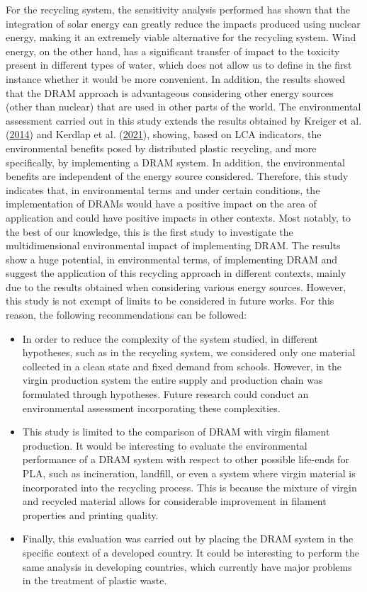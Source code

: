 \documentclass[12pt]{elsarticle} %
\begin{document}
For the recycling system, the sensitivity analysis performed has shown that the integration of solar energy can greatly reduce the impacts produced using nuclear energy, making it an extremely viable alternative for the recycling system.
Wind energy, on the other hand, has a significant transfer of impact to the toxicity present in different types of water, which does not allow us to define in the first instance whether it would be more convenient.
In addition, the results showed that the DRAM approach is advantageous considering other energy sources (other than nuclear) that are used in other parts of the world.
The environmental assessment carried out in this study extends the results obtained by Kreiger et al. (\protect\hyperlink{ref-Kreiger2014}{2014}) and Kerdlap et al. (\protect\hyperlink{ref-Kerdlap2021}{2021}), showing, based on LCA indicators, the environmental benefits posed by distributed plastic recycling, and more specifically, by implementing a DRAM system.
In addition, the environmental benefits are independent of the energy source considered.
Therefore, this study indicates that, in environmental terms and under certain conditions, the implementation of DRAMs would have a positive impact on the area of application and could have positive impacts in other contexts.
Most notably, to the best of our knowledge, this is the first study to investigate the multidimensional environmental impact of implementing DRAM.
The results show a huge potential, in environmental terms, of implementing DRAM and suggest the application of this recycling approach in different contexts, mainly due to the results obtained when considering various energy sources.
However, this study is not exempt of limits to be considered in future works. For this reason, the following recommendations can be followed:

\begin{itemize}
\item
  In order to reduce the complexity of the system studied, in different hypotheses, such as in the recycling system, we considered only one material collected in a clean state and fixed demand from schools. However, in the virgin production system the entire supply and production chain was formulated through hypotheses. Future research could conduct an environmental assessment incorporating these complexities.
\item
  This study is limited to the comparison of DRAM with virgin filament production. It would be interesting to evaluate the environmental performance of a DRAM system with respect to other possible life-ends for PLA, such as incineration, landfill, or even a system where virgin material is incorporated into the recycling process. This is because the mixture of virgin and recycled material allows for considerable improvement in filament properties and printing quality.
\item
  Finally, this evaluation was carried out by placing the DRAM system in the specific context of a developed country. It could be interesting to perform the same analysis in developing countries, which currently have major problems in the treatment of plastic waste.
\end{itemize}
\end{document}
